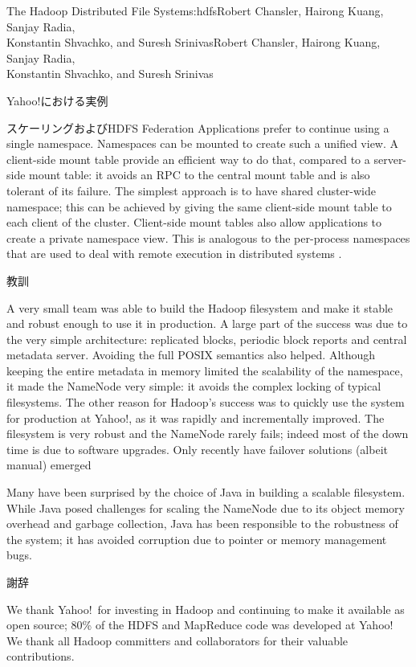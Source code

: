 \begin{aosachaptertoc}{The Hadoop Distributed File System}{s:hdfs}{Robert Chansler, Hairong Kuang, Sanjay Radia, \\ Konstantin Shvachko, and Suresh Srinivas}{Robert Chansler, Hairong Kuang, Sanjay Radia, \\ \hspace*{0.9cm} Konstantin Shvachko, and Suresh Srinivas}
\begin{aosasect1}{Yahoo!における実例}
\begin{aosasect2}{スケーリングおよびHDFS Federation}
Applications prefer to continue using a single namespace. Namespaces
can be mounted to create such a unified view. A client-side mount
table provide an efficient way to do that, compared to a server-side
mount table: it avoids an RPC to the central mount table and is also
tolerant of its failure. The simplest approach is to have shared
cluster-wide namespace; this can be achieved by giving the same
client-side mount table to each client of the cluster. Client-side
mount tables also allow applications to create a private namespace
view. This is analogous to the per-process namespaces that are used to
deal with remote execution in distributed systems
\cite{bib:pike:names,bib:radia:naming,bib:radia:naming2}.

\end{aosasect2}

\end{aosasect1}

\begin{aosasect1}{教訓}

A very small team was able to build the Hadoop filesystem and make it
stable and robust enough to use it in production.  A large part of the
success was due to the very simple architecture: replicated blocks,
periodic block reports and central metadata server. Avoiding the full
POSIX semantics also helped. Although keeping the entire metadata in
memory limited the scalability of the namespace, it made the NameNode
very simple: it avoids the complex locking of typical filesystems. The
other reason for Hadoop's success was to quickly use the system for
production at Yahoo!, as it was rapidly and incrementally
improved. The filesystem is very robust and the NameNode rarely fails;
indeed most of the down time is due to software upgrades. Only
recently have failover solutions (albeit manual) emerged

Many have been surprised by the choice of Java in building a scalable
filesystem. While Java posed challenges for scaling the NameNode due
to its object memory overhead and garbage collection, Java has been
responsible to the robustness of the system; it has avoided
corruption due to pointer or memory management bugs.

\end{aosasect1}

\begin{aosasect1}{謝辞}

We thank Yahoo!\ for investing in Hadoop and continuing to
make it available as open source; 80\% of the HDFS and MapReduce code
was developed at Yahoo! We thank all Hadoop committers and
collaborators for their valuable contributions.

\end{aosasect1}

\end{aosachaptertoc}
